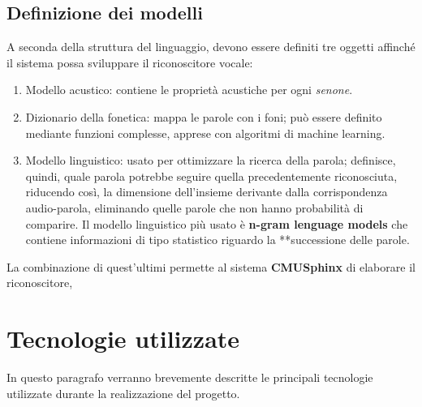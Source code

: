 \documentclass[12pt]{article}
\begin{document}
    \subsection {Definizione dei modelli}
    A seconda della struttura del linguaggio, devono essere definiti tre oggetti affinché il sistema possa sviluppare il riconoscitore vocale:
        \begin{enumerate}
            \item Modello acustico: contiene le proprietà acustiche per ogni \textit{senone}.
            \item Dizionario della fonetica: mappa le parole con i foni; può essere definito mediante funzioni complesse, apprese con algoritmi di machine learning.
            \item Modello linguistico: usato per ottimizzare la ricerca della parola; definisce, quindi, quale parola potrebbe seguire quella precedentemente riconosciuta, riducendo così, la dimensione dell'insieme derivante dalla corrispondenza audio-parola, eliminando quelle parole che non hanno probabilità di comparire. Il modello linguistico più usato è \textbf{n-gram lenguage models} che contiene informazioni di tipo statistico riguardo la **successione delle parole.
        \end{enumerate}

    La combinazione di quest'ultimi permette al sistema \textbf{CMUSphinx} di elaborare il riconoscitore, 

\newpage
\section{Tecnologie utilizzate}
    In questo paragrafo verranno brevemente descritte le principali tecnologie utilizzate durante la realizzazione del progetto.
    
\end{document}

